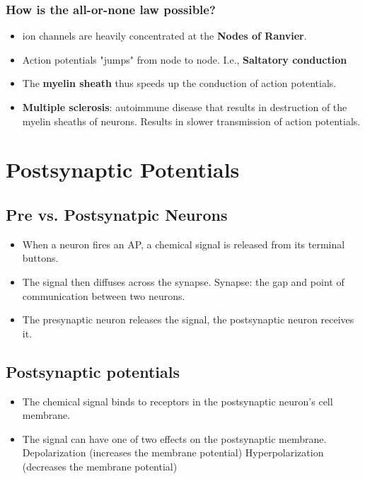 \documentclass[12pt,a4paper]{article}
\begin{document}
	\subsubsection{How is the all-or-none law possible?}
	
	\begin{itemize}
		\item {} ion channels are heavily concentrated at the \textbf{Nodes of Ranvier}.
		\item Action potentials "jumps" from node to node. 
		\subitem I.e., \textbf{Saltatory conduction}
		\item The \textbf{myelin sheath} thus speeds up the conduction of action potentials.
		\item \textbf{Multiple sclerosis}: autoimmune disease that results in destruction of the myelin sheaths of neurons. 
		\subitem Results in slower transmission of action potentials. 
	\end{itemize}
	
	\section{Postsynaptic Potentials}
	
	\subsection{Pre vs. Postsynatpic Neurons}
	
	\begin{itemize}
		\item When a neuron fires an AP, a chemical signal is released from its terminal buttons. 
		\item The signal then diffuses across the synapse. 
		\subitem Synapse: the gap and point of communication between two neurons. 
		\item The presynaptic neuron releases the signal, the postsynaptic neuron receives it. 
	\end{itemize}
	
	\subsection{Postsynaptic potentials}
	
	\begin{itemize}
		\item The chemical signal binds to receptors in the postsynaptic neuron's cell membrane. 
		\item The signal can have one of two effects on the postsynaptic membrane. 
		\subitem Depolarization (increases the membrane potential)
		\subitem Hyperpolarization (decreases the membrane potential)
	\end{itemize}
	
\end{document}
